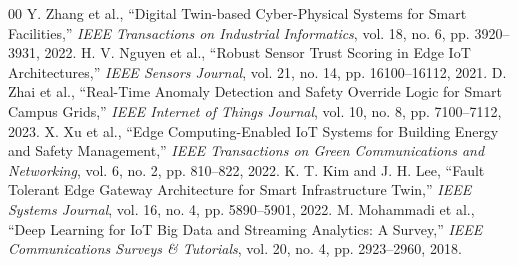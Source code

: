 \documentclass[conference]{IEEEtran}
\begin{document}
\begin{thebibliography}{00}
 Y. Zhang et al., ``Digital Twin-based Cyber-Physical Systems for Smart Facilities,'' \textit{IEEE Transactions on Industrial Informatics}, vol. 18, no. 6, pp. 3920--3931, 2022.
 H. V. Nguyen et al., ``Robust Sensor Trust Scoring in Edge IoT Architectures,'' \textit{IEEE Sensors Journal}, vol. 21, no. 14, pp. 16100--16112, 2021.
 D. Zhai et al., ``Real-Time Anomaly Detection and Safety Override Logic for Smart Campus Grids,'' \textit{IEEE Internet of Things Journal}, vol. 10, no. 8, pp. 7100--7112, 2023.
 X. Xu et al., ``Edge Computing-Enabled IoT Systems for Building Energy and Safety Management,'' \textit{IEEE Transactions on Green Communications and Networking}, vol. 6, no. 2, pp. 810--822, 2022.
 K. T. Kim and J. H. Lee, ``Fault Tolerant Edge Gateway Architecture for Smart Infrastructure Twin,'' \textit{IEEE Systems Journal}, vol. 16, no. 4, pp. 5890--5901, 2022.
 M. Mohammadi et al., ``Deep Learning for IoT Big Data and Streaming Analytics: A Survey,'' \textit{IEEE Communications Surveys \& Tutorials}, vol. 20, no. 4, pp. 2923--2960, 2018.
\end{thebibliography}
\end{document}
